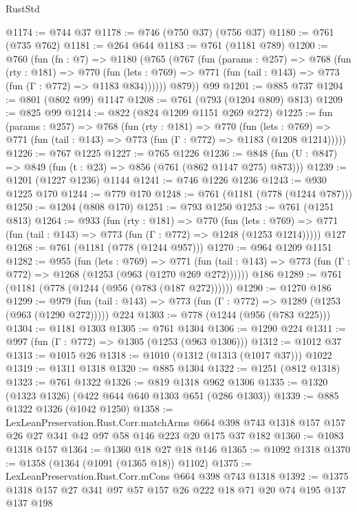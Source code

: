 \begin{lexlean}{RustStd}
\begin{coremodule}
@1174 := @744 @37
@1178 := @746 (@750 @37) (@756 @37)
@1180 := @761 (@735 @762)
@1181 := @264 @644
@1183 := @761 (@1181 @789)
@1200 := @760
    (fun (fn : @7) =>
    @1180
      (@765
        (@767
          (fun (params : @257) =>
          @768
            (fun (rty : @181) =>
            @770
              (fun (lets : @769) =>
              @771 (fun (tail : @143) => @773 (fun (Γ : @772) => @1183 @834))))))
        @879))
    @99
@1201 := @885 @737
@1204 := @801 (@802 @99) @1147
@1208 := @761 (@793 (@1204 @809) @813)
@1209 := @825 @99
@1214 := @822 (@824 @1209 @1151 @269 @272)
@1225 := fun (params : @257) =>
  @768
    (fun (rty : @181) =>
    @770
      (fun (lets : @769) =>
      @771 (fun (tail : @143) => @773 (fun (Γ : @772) => @1183 (@1208 @1214)))))
@1226 := @767 @1225
@1227 := @765 @1226
@1236 := @848 (fun (U : @847) => @849 (fun (t : @23) => @856 (@761 (@862 @1147 @275) @873)))
@1239 := @1201 (@1227 @1236) @1144
@1241 := @746 @1226 @1236
@1243 := @930 @1225 @170
@1244 := @779 @170
@1248 := @761 (@1181 (@778 (@1244 @787)))
@1250 := @1204 (@808 @170)
@1251 := @793 @1250
@1253 := @761 (@1251 @813)
@1264 := @933
    (fun (rty : @181) =>
    @770
      (fun (lets : @769) =>
      @771 (fun (tail : @143) => @773 (fun (Γ : @772) => @1248 (@1253 @1214)))))
    @127
@1268 := @761 (@1181 (@778 (@1244 @957)))
@1270 := @964 @1209 @1151
@1282 := @955
    (fun (lets : @769) =>
    @771 (fun (tail : @143) => @773 (fun (Γ : @772) => @1268 (@1253 (@963 (@1270 @269 @272))))))
    @186
@1289 := @761 (@1181 (@778 (@1244 (@956 (@783 (@187 @272))))))
@1290 := @1270 @186
@1299 := @979 (fun (tail : @143) => @773 (fun (Γ : @772) => @1289 (@1253 (@963 (@1290 @272))))) @224
@1303 := @778 (@1244 (@956 (@783 @225)))
@1304 := @1181 @1303
@1305 := @761 @1304
@1306 := @1290 @224
@1311 := @997 (fun (Γ : @772) => @1305 (@1253 (@963 @1306)))
@1312 := @1012 @37
@1313 := @1015 @26
@1318 := @1010 (@1312 (@1313 (@1017 @37))) @1022
@1319 := @1311 @1318
@1320 := @885 @1304
@1322 := @1251 (@812 @1318)
@1323 := @761 @1322
@1326 := @819 @1318 @962 @1306
@1335 := @1320 (@1323 @1326) (@422 @644 @640 @1303 @651 (@286 @1303))
@1339 := @885 @1322 @1326 (@1042 @1250)
@1358 := LexLeanPreservation.Rust.Corr.matchArms
    @664
    @398
    @743
    @1318
    @157
    @157
    @26
    @27
    @341
    @42
    @97
    @58
    @146
    @223
    @20
    @175
    @37
    @182
@1360 := @1083 @1318 @157
@1364 := @1360 @18 @27 @18 @146
@1365 := @1092 @1318
@1370 := @1358 (@1364 (@1091 (@1365 @18)) @1102)
@1375 := LexLeanPreservation.Rust.Corr.mCons @664 @398 @743 @1318
@1392 := @1375 @1318 @157 @27 @341 @97 @57 @157 @26 @222 @18 @71 @20 @74 @195 @137 @137 @198

\end{coremodule}
\end{lexlean}
